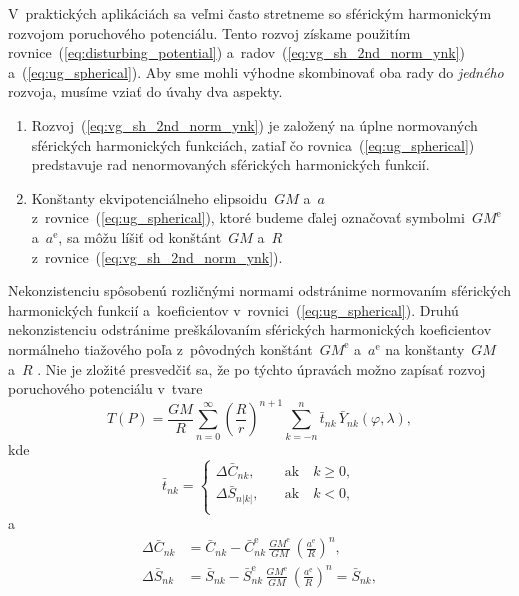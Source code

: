 \documentclass[a4paper, 12pt]{book}
\begin{document}
V~praktických aplikáciách sa veľmi často stretneme so sférickým harmonickým 
rozvojom poruchového potenciálu.  Tento rozvoj získame použitím 
rovnice~(\ref{eq:disturbing_potential}) a~radov~(\ref{eq:vg_sh_2nd_norm_ynk}) 
a~(\ref{eq:ug_spherical}).  Aby sme mohli výhodne skombinovať oba rady do 
\emph{jedného} rozvoja, musíme vziať do úvahy dva aspekty.  
%
\begin{enumerate}
\item Rozvoj~(\ref{eq:vg_sh_2nd_norm_ynk}) je založený na úplne normovaných 
sférických harmonických funkciách, zatiaľ čo rovnica~(\ref{eq:ug_spherical}) 
predstavuje rad nenormovaných sférických harmonických funkcií.
%
\item Konštanty ekvipotenciálneho elipsoidu~$GM$ a~$a$ 
z~rovnice~(\ref{eq:ug_spherical}), ktoré budeme ďalej označovať 
symbolmi~$GM^\mathrm{e}$ a~$a^\mathrm{e}$, sa môžu líšiť od konštánt~$GM$ a~$R$ 
z~rovnice~(\ref{eq:vg_sh_2nd_norm_ynk}).
\end{enumerate}
%
Nekonzistenciu spôsobenú rozličnými normami odstránime normovaním sférických 
harmonických funkcií a~koeficientov v~rovnici~(\ref{eq:ug_spherical}).  Druhú 
nekonzistenciu odstránime preškálovaním sférických harmonických koeficientov 
normálneho tiažového poľa z~pôvodných konštánt~$GM^\mathrm{e}$ a~$a^\mathrm{e}$ 
na konštanty~$GM$ a~$R$ \parencite[pozri napríklad][]{Barthelmes2013}.  Nie je 
zložité presvedčiť sa, že po týchto úpravách možno zapísať rozvoj poruchového 
potenciálu v~tvare
%
\begin{equation}
\label{eq:t_sh}
T(P) = \frac{GM}{R} \sum_{n = 0}^\infty \left( \frac{R}{r} \right)^{n
+ 1} \sum_{k = -n}^{n} \bar{t}_{nk} \, \bar{Y}_{nk}(\varphi, \lambda){,}
\end{equation}
%
kde
%
\begin{equation}
\bar{t}_{nk} =
%
\begin{cases}
\Delta \bar{C}_{nk}{,}   \quad &\textrm{ak} \quad k \geq 0{,}\\
\Delta \bar{S}_{n|k|}{,} \quad &\textrm{ak} \quad k < 0{,}\\
\end{cases}
\end{equation}
%
a
%
\begin{equation}
\begin{split}
\Delta \bar{C}_{nk} &= \bar{C}_{nk} - \bar{C}_{nk}^\mathrm{e} \, 
\frac{GM^\mathrm{e}}{GM} \, \left( \frac{a^\mathrm{e}}{R} \right)^n{,}\\
\Delta \bar{S}_{nk} &= \bar{S}_{nk} - \bar{S}_{nk}^\mathrm{e} \, 
\frac{GM^\mathrm{e}}{GM} \, \left( \frac{a^\mathrm{e}}{R} \right)^n 
= \bar{S}_{nk}{,}
\end{split}
\end{equation}
\end{document}
